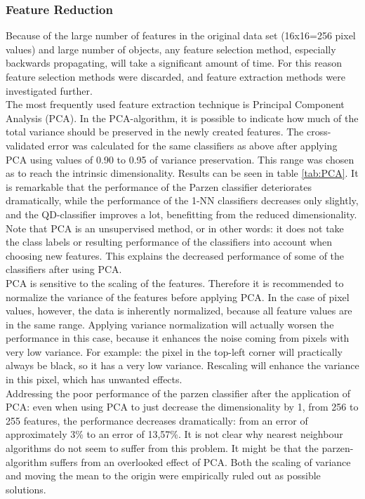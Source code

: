 \subsubsection*{Feature Reduction}
Because of the large number of features in the original data set (16x16=256 pixel values) and large number of objects, any feature selection method, especially backwards propagating, will take a significant amount of time. For this reason feature selection methods were discarded, and feature extraction methods were investigated further. \\
The most frequently used feature extraction technique is Principal Component Analysis (PCA). In the PCA-algorithm, it is possible to indicate how much of the total variance should be preserved in the newly created features. The cross-validated error was calculated for the same classifiers as above after applying PCA using values of 0.90 to 0.95 of variance preservation. This range was chosen as to reach the intrinsic dimensionality. Results can be seen in table \ref{tab:PCA}. It is remarkable that the performance of the Parzen classifier deteriorates dramatically, while the performance of the 1-NN classifiers decreases only slightly, and the QD-classifier improves a lot, benefitting from the reduced dimensionality. Note that PCA is an unsupervised method, or in other words: it does not take the class labels or resulting performance of the classifiers into account when choosing new features. This explains the decreased performance of some of the classifiers after using PCA. \\
PCA is sensitive to the scaling of the features. Therefore it is recommended to normalize the variance of the features before applying PCA. In the case of pixel values, however, the data is inherently normalized, because all feature values are in the same range. Applying variance normalization will actually worsen the performance in this case, because it enhances the noise coming from pixels with very low variance. For example: the pixel in the top-left corner will practically always be black, so it has a very low variance. Rescaling will enhance the variance in this pixel, which has unwanted effects. \\
Addressing the poor performance of the parzen classifier after the application of PCA: even when using PCA to just decrease the dimensionality by 1, from 256 to 255 features, the performance decreases dramatically: from an error of approximately 3\% to an error of 13,57\%.  It is not clear why nearest neighbour algorithms do not seem to suffer from this problem. It might be that the parzen-algorithm suffers from an overlooked effect of PCA. Both the scaling of variance and moving the mean to the origin were empirically ruled out as possible solutions. \\
